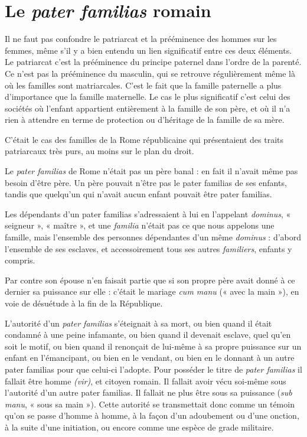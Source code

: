 \section{Le \emph{pater familias} romain}

Il ne faut pas confondre le patriarcat et la prééminence des hommes
sur les femmes, même s'il y a bien entendu un lien significatif entre
ces deux éléments. Le patriarcat c'est la prééminence du principe paternel
dans l'ordre de la parenté. Ce n'est pas la prééminence du masculin, qui
se retrouve régulièrement même là où les familles sont matriarcales. C'est
le fait que la famille paternelle a plus d'importance que la famille maternelle.
Le cas le plus significatif c'est celui des sociétés où l'enfant appartient
entièrement à la famille de son père, et où il n'a rien à attendre en
terme de protection ou d'héritage de la famille de sa mère.

C'était le cas des familles de la Rome républicaine qui présentaient
des traits patriarcaux très purs, au moins sur le plan du droit.

Le \emph{pater familias} de Rome n'était pas un père banal : en fait il n'avait
même pas besoin d'être père. Un père pouvait n'être pas le pater familias
de ses enfants, tandis que quelqu'un qui n'avait aucun enfant pouvait être
pater familias.

Les dépendants d'un pater familias s'adressaient à lui en l'appelant
\emph{dominus}, « seigneur », « maître », et une \emph{familia} n'était pas ce que nous
appelons une famille, mais l'ensemble des personnes dépendantes d'un même
\emph{dominus} : d'abord l'ensemble de ses esclaves, et accessoirement tous ses
autres \emph{familiers}, enfants y compris.

Par contre son épouse n'en faisait partie que si son propre père
avait donné à ce dernier sa puissance sur elle : c'était le mariage \emph{cum manu}
(« avec la main »), en voie de désuétude à la fin de la République.

L'autorité d'un \emph{pater familias} s'éteignait à sa mort, ou bien quand il
était condamné à une peine infamante, ou bien quand il devenait esclave,
quel qu'en soit le motif, ou bien quand il renonçait de lui-même à sa
propre puissance sur un enfant en l'émancipant, ou bien en le vendant,
ou bien en le donnant à un autre pater familias pour que celui-ci l'adopte.
Pour posséder le titre de \emph{pater familias} il fallait être homme \emph{(vir)}, et citoyen
romain. Il fallait avoir vécu soi-même sous l'autorité d'un autre pater familias.
Il fallait ne plus être sous sa puissance (\emph{sub manu}, « sous sa main »).
Cette autorité se transmettait donc comme un témoin qu'on se passe
d'homme à homme, à la façon d'un adoubement ou d'une onction, à la
suite d'une initiation, ou encore comme une espèce de grade militaire.

